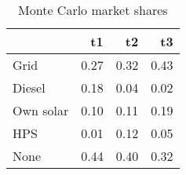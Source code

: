 \begin{table}[!ht]
	\centering
		\caption{Monte Carlo market shares}
\begin{tabular}{lrrr}
		\toprule
               &        t1&        t2&        t3\\
		\midrule
		           Grid&      0.27&      0.32&      0.43\\
		         Diesel&      0.18&      0.04&      0.02\\
		      Own solar&      0.10&      0.11&      0.19\\
		            HPS&      0.01&      0.12&      0.05\\
		           None&      0.44&      0.40&      0.32\\
		\bottomrule
	\end{tabular}
\end{table}
